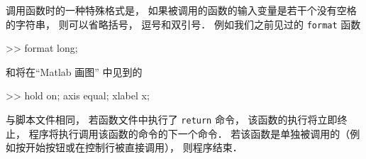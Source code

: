调用函数时的一种特殊格式是， 如果被调用的函数的输入变量是若干个没有空格的字符串， 则可以省略括号， 逗号和双引号． 例如我们之前见过的 \texttt{format} 函数
\begin{Command}
>> format {\color{string}long};
\end{Command}
和将在“Matlab 画图” 中见到的
\begin{Command}
>> hold {\color{string}on}; axis {\color{string}equal}; xlabel {\color{string}x};
\end{Command}

与脚本文件相同， 若函数文件中执行了 \texttt{return} 命令， 该函数的执行将立即终止， 程序将执行调用该函数的命令的下一个命令． 若该函数是单独被调用的（例如按开始按钮或在控制行被直接调用）， 则程序结束．